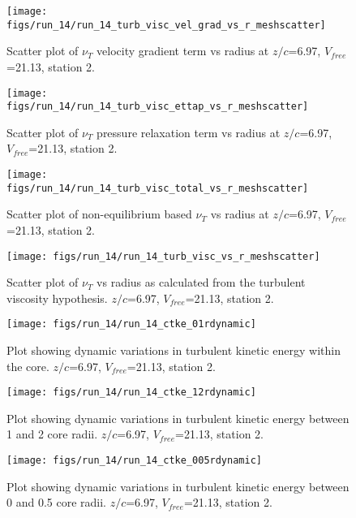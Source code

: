 \begin{figure}[H]
\centering
\texttt{[image: figs/run\_14/run\_14\_turb\_visc\_vel\_grad\_vs\_r\_meshscatter]}
\caption{Scatter plot of $\nu_T$ velocity gradient term vs radius at $z/c$=6.97, $V_{free}$=21.13, station 2.}
\end{figure}


\begin{figure}[H]
\centering
\texttt{[image: figs/run\_14/run\_14\_turb\_visc\_ettap\_vs\_r\_meshscatter]}
\caption{Scatter plot of $\nu_T$ pressure relaxation term vs radius at $z/c$=6.97, $V_{free}$=21.13, station 2.}
\end{figure}


\begin{figure}[H]
\centering
\texttt{[image: figs/run\_14/run\_14\_turb\_visc\_total\_vs\_r\_meshscatter]}
\caption{Scatter plot of non-equilibrium based $\nu_T$ vs radius at $z/c$=6.97, $V_{free}$=21.13, station 2.}
\end{figure}


\begin{figure}[H]
\centering
\texttt{[image: figs/run\_14/run\_14\_turb\_visc\_vs\_r\_meshscatter]}
\caption{Scatter plot of $\nu_T$ vs radius as calculated from the turbulent viscosity hypothesis. $z/c$=6.97, $V_{free}$=21.13, station 2.}
\end{figure}


\begin{figure}[H]
\centering
\texttt{[image: figs/run\_14/run\_14\_ctke\_01rdynamic]}
\caption{Plot showing dynamic variations in turbulent kinetic energy within the core. $z/c$=6.97, $V_{free}$=21.13, station 2.}
\end{figure}


\begin{figure}[H]
\centering
\texttt{[image: figs/run\_14/run\_14\_ctke\_12rdynamic]}
\caption{Plot showing dynamic variations in turbulent kinetic energy between 1 and 2 core radii. $z/c$=6.97, $V_{free}$=21.13, station 2.}
\end{figure}


\begin{figure}[H]
\centering
\texttt{[image: figs/run\_14/run\_14\_ctke\_005rdynamic]}
\caption{Plot showing dynamic variations in turbulent kinetic energy between 0 and 0.5 core radii. $z/c$=6.97, $V_{free}$=21.13, station 2.}
\end{figure}


